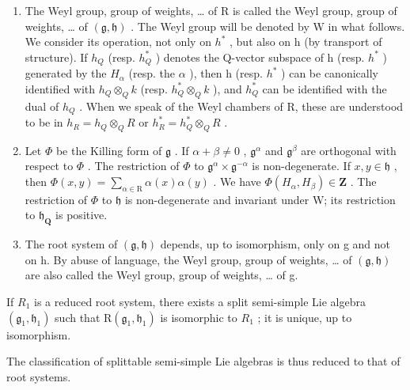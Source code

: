 \begin{enumerate}
\def\labelenumi{\arabic{enumi})}
\setcounter{enumi}{9}
\item
  The Weyl group, group of weights, \ldots{} of R is called the Weyl group, group of weights, \ldots{} of \((\mathfrak{g},\mathfrak{h})\) . The Weyl group will be denoted by W in what follows. We consider its operation, not only on \(h^{*}\) , but also on h (by transport of structure). If \(h_{Q}\) (resp. \(h_{Q}^{*}\) ) denotes the Q-vector subspace of h (resp. \(h^{*}\) ) generated by the \(H_{\alpha}\) (resp. the \(\alpha\) ), then h (resp. \(h^{*}\) ) can be canonically identified with \(h_{Q} \otimes_{Q} k\) (resp. \(h_{Q}^{*} \otimes_{Q} k\) ), and \(h_{Q}^{*}\) can be identified with the dual of \(h_{Q}\) . When we speak of the Weyl chambers of R, these are understood to be in \(h_{R} = h_{Q} \otimes_{Q} R\) or \(h_{R}^{*} = h_{Q}^{*} \otimes_{Q} R\) .
\item
  Let \(\varPhi\) be the Killing form of \(\mathfrak{g}\) . If \(\alpha + \beta \neq 0\) , \(\mathfrak{g}^{\alpha}\) and \(\mathfrak{g}^{\beta}\) are orthogonal with respect to \(\varPhi\) . The restriction of \(\varPhi\) to \(\mathfrak{g}^{\alpha} \times \mathfrak{g}^{-\alpha}\) is non-degenerate. If \(x, y \in \mathfrak{h}\) , then \(\varPhi(x, y) = \sum_{\alpha \in \mathrm{R}} \alpha(x)\alpha(y)\) . We have \(\varPhi(H_{\alpha}, H_{\beta}) \in \mathbf{Z}\) . The restriction of \(\varPhi\) to \(\mathfrak{h}\) is non-degenerate and invariant under W; its restriction to \(\mathfrak{h}_{\mathbf{Q}}\) is positive.
\item
  The root system of \((\mathfrak{g},\mathfrak{h})\) depends, up to isomorphism, only on g and not on h. By abuse of language, the Weyl group, group of weights, \ldots{} of \((\mathfrak{g},\mathfrak{h})\) are also called the Weyl group, group of weights, \ldots{} of g.
\end{enumerate}

If \(R_{1}\) is a reduced root system, there exists a split semi-simple Lie algebra \((\mathfrak{g}_{1},\mathfrak{h}_{1})\) such that \(\mathrm{R}(\mathfrak{g}_{1},\mathfrak{h}_{1})\) is isomorphic to \(R_{1}\) ; it is unique, up to isomorphism.

The classification of splittable semi-simple Lie algebras is thus reduced to that of root systems.

